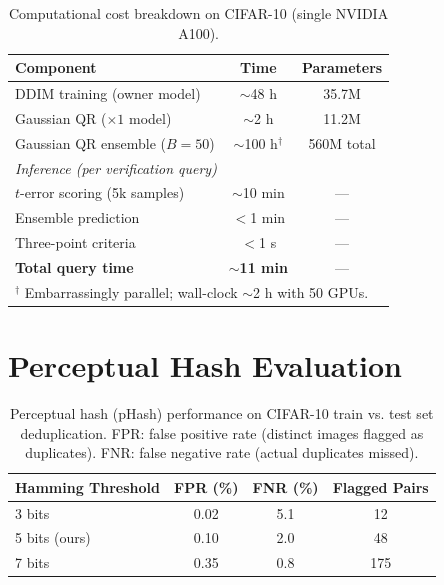 \documentclass[sigconf, review, anonymous]{acmart}
\begin{document}
\begin{table}[h]
\caption{Computational cost breakdown on CIFAR-10 (single NVIDIA A100).}
\label{tab:cost}
\begin{center}
\begin{small}
\begin{tabular}{lcc}
\toprule
Component & Time & Parameters \\
\midrule
DDIM training (owner model) & $\sim$48 h & 35.7M \\
Gaussian QR ($\times 1$ model) & $\sim$2 h & 11.2M \\
Gaussian QR ensemble ($B{=}50$) & $\sim$100 h$^\dagger$ & 560M total \\
\midrule
\multicolumn{3}{l}{\textit{Inference (per verification query)}} \\
$t$-error scoring (5k samples) & $\sim$10 min & --- \\
Ensemble prediction & $<$1 min & --- \\
Three-point criteria & $<$1 s & --- \\
\midrule
\textbf{Total query time} & \textbf{$\sim$11 min} & --- \\
\bottomrule
\multicolumn{3}{l}{\footnotesize $^\dagger$ Embarrassingly parallel; wall-clock $\sim$2 h with 50 GPUs.} \\
\end{tabular}
\end{small}
\end{center}
\end{table}

\section{Perceptual Hash Evaluation}
\label{app:phash}

\begin{table}[h]
\caption{Perceptual hash (pHash) performance on CIFAR-10 train vs. test set deduplication. FPR: false positive rate (distinct images flagged as duplicates). FNR: false negative rate (actual duplicates missed).}
\begin{center}
\begin{tabular}{lccc}
\toprule
Hamming Threshold & FPR (\%) & FNR (\%) & Flagged Pairs \\
\midrule
3 bits & 0.02 & 5.1 & 12 \\
5 bits (ours) & 0.10 & 2.0 & 48 \\
7 bits & 0.35 & 0.8 & 175 \\
\bottomrule
\end{tabular}
\end{center}
\end{table}
\end{document}
